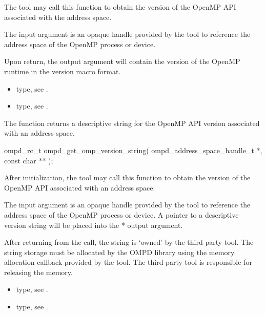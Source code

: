\descr
The tool may call this function to obtain the version of the OpenMP API associated with the address space.

\argdesc
The input argument  is an opaque handle provided by the tool
to reference the address space of the OpenMP process or device.

Upon return, the output argument  will contain the version of the OpenMP runtime in the  version macro format.

\crossreferences
\begin{itemize}
	\item {} type, see .
	\item {} type, see .
\end{itemize}

\label{subsubsubsec:ompd_get_omp_version_string}

\summary
The  function returns a descriptive string for the OpenMP
API version associated with an address space.

\format

\begin{cspecific}
\begin{ompSyntax}
ompd_rc_t ompd_get_omp_version_string(
  ompd_address_space_handle_t *,
  const char **
);
\end{ompSyntax}
\end{cspecific}

\descr
After initialization, the tool may call this function to obtain the version of the OpenMP
API associated with an address space.

\argdesc
The input argument  is an opaque handle provided by the tool
to reference the address space of the OpenMP process or device.
A pointer to a descriptive version string will be placed into the * output 
argument.

After returning from the call, the string is `owned' by the third-party tool.
The string storage must be allocated by the OMPD library using the memory allocation 
callback provided by the tool.
The third-party tool is responsible for releasing the memory.

\crossreferences
\begin{itemize}
	\item {} type, see .
	\item {} type, see .
\end{itemize}


